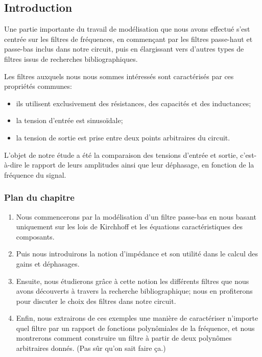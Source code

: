 \subsection*{Introduction}

Une partie importante du travail de modélisation que nous avons effectué
s'est centrée sur les filtres de fréquences,
en commençant par les filtres passe-haut et passe-bas inclus dans notre circuit,
puis en élargissant vers d'autres types de filtres issus de recherches
bibliographiques.

Les filtres auxquels nous nous sommes intéressés sont caractérisés
par ces propriétés communes:
\begin{itemize}
    \item ils utilisent exclusivement des résistances,
        des capacités et des inductances;
    \item la tension d'entrée est sinusoïdale;
    \item la tension de sortie est prise entre deux points arbitraires
        du circuit.
\end{itemize}

L'objet de notre étude a été la comparaison des tensions d'entrée et sortie,
c'est-à-dire le rapport de leurs amplitudes ainsi que leur déphasage,
en fonction de la fréquence du signal.


\subsubsection*{Plan du chapitre}
\begin{enumerate}
    \item Nous commencerons par la modélisation
        d'un filtre passe-bas en nous basant uniquement sur les lois
        de Kirchhoff et les équations caractéristiques des composants.
    \item Puis nous introduirons la notion d'impédance et son utilité
        dans le calcul des gains et déphasages.
    \item Ensuite, nous étudierons grâce à cette notion
        les différents filtres que nous avons découverts à travers
        la recherche bibliographique;
        nous en profiterons pour discuter
        le choix des filtres dans notre circuit.
    \item Enfin, nous extrairons de ces exemples une manière de caractériser
        n'importe quel filtre par un rapport de fonctions
        polynômiales de la fréquence, et nous montrerons comment construire
        un filtre à partir de deux polynômes arbitraires donnés.
        (Pas sûr qu'on sait faire ça.)
\end{enumerate}
